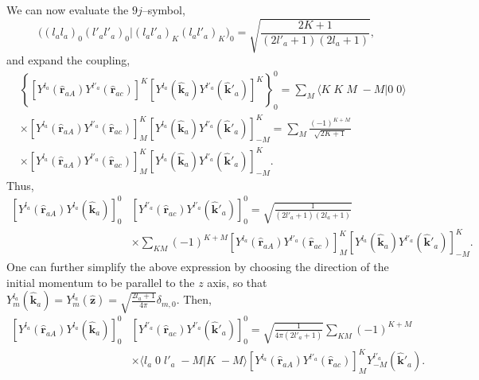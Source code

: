 \begin{subappendices}
We can now evaluate the $9j$--symbol,
\begin{equation}\label{eqC6AppG11}
\bigl((l_a l_a)_0(l'_a l'_a)_0|(l_a l'_a)_K(l_a l'_a)_K\bigr)_0=\sqrt{\frac{2K+1}{(2l'_a+1)(2l_a+1)}},
\end{equation}
and expand the coupling,
\begin{equation}\label{eqC6AppG12}
\begin{split}
&\left\{\left[ Y^{l_a}(\hat{\mathbf r}_{aA})  Y^{l'_a} (\hat{ \mathbf r}_{ac})\right]^K \left[Y^{l_a} (\hat{\mathbf k}_{a}) Y^{l'_a} (\hat{ \mathbf k}'_{a})\right]^K\right\}^0_0=\sum_M \langle K\;K\;M\;-M|0\;0\rangle\\
&\times \left[ Y^{l_a} (\hat{\mathbf r}_{aA}) Y^{l'_a} (\hat{ \mathbf r}_{ac})\right]^K_M \left[Y^{l_a} (\hat{\mathbf k}_{a}) Y^{l'_a} (\hat{ \mathbf k}'_{a})\right]^K_{-M}=\sum_M\frac{(-1)^{K+M}}{\sqrt{2K+1}}\\
&\times \left[ Y^{l_a} (\hat{\mathbf r}_{aA}) Y^{l'_a} (\hat{ \mathbf r}_{ac})\right]^K_M \left[Y^{l_a} (\hat{\mathbf k}_{a}) Y^{l'_a} (\hat{ \mathbf k}'_{a})\right]^K_{-M}.
\end{split}
\end{equation}
Thus,
\begin{equation}\label{eqC6AppG13}
\begin{split}
\left[ Y^{l_a} (\hat{\mathbf r}_{aA}) Y^{l_a} (\hat{ \mathbf k}_{a})\right]^0_0 & \left[ Y^{l'_a} (\hat{\mathbf r}_{ac}) Y^{l'_a} (\hat{ \mathbf k}'_{a})\right]^0_0=\sqrt{\frac{1}{(2l'_a+1)(2l_a+1)}}\\
&\times\sum_{KM}(-1)^{K+M}\left[ Y^{l_a} (\hat{\mathbf r}_{aA}) Y^{l'_a} (\hat{ \mathbf r}_{ac})\right]^K_M \left[Y^{l_a} (\hat{\mathbf k}_{a}) Y^{l'_a} (\hat{ \mathbf k}'_{a})\right]^K_{-M}.
\end{split}
\end{equation}
One can further simplify the above expression by choosing the direction of the initial momentum to be parallel to the $z$ axis, so that $Y^{l_a}_m (\hat{\mathbf k}_{a})=Y^{l_a}_m (\hat{\mathbf z})=\sqrt{\frac{2l_a+1}{4\pi}}\delta_{m,0}$. Then,
\begin{equation}\label{eqC6AppF10}
\begin{split}
\left[ Y^{l_a} (\hat{\mathbf r}_{aA}) Y^{l_a} (\hat{ \mathbf k}_{a})\right]^0_0 & \left[ Y^{l'_a} (\hat{\mathbf r}_{ac}) Y^{l'_a} (\hat{ \mathbf k}'_{a})\right]^0_0=\sqrt{\frac{1}{4\pi(2l'_a+1)}}\sum_{KM}(-1)^{K+M}\\
&\times\langle l_a\;0\;l'_a\;-M|K\;-M\rangle\left[ Y^{l_a} (\hat{\mathbf r}_{aA}) Y^{l'_a} (\hat{ \mathbf r}_{ac})\right]^K_M   Y^{l'_a}_{-M} (\hat{ \mathbf k}'_{a}).

\end{split}
\end{equation}
\end{subappendices}
